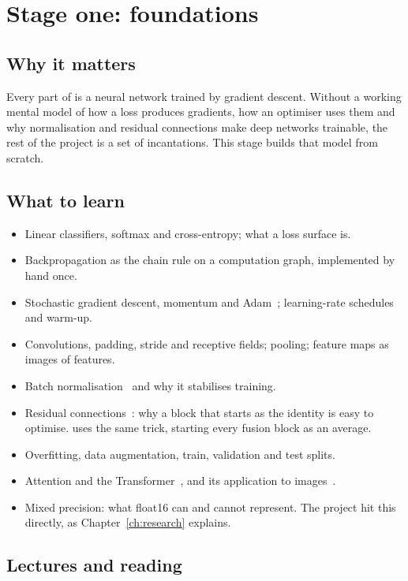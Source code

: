 \chapter{Stage one: foundations}

\section{Why it matters}

Every part of \method{} is a neural network trained by gradient descent. Without a working mental model of
how a loss produces gradients, how an optimiser uses them and why normalisation and residual connections make
deep networks trainable, the rest of the project is a set of incantations. This stage builds that model from
scratch.

\section{What to learn}

\begin{itemize}
  \item Linear classifiers, softmax and cross-entropy; what a loss surface is.
  \item Backpropagation as the chain rule on a computation graph, implemented by hand once.
  \item Stochastic gradient descent, momentum and Adam~\cite{kingma2015adam}; learning-rate schedules and warm-up.
  \item Convolutions, padding, stride and receptive fields; pooling; feature maps as images of features.
  \item Batch normalisation~\cite{ioffe2015batchnorm} and why it stabilises training.
  \item Residual connections~\cite{he2016resnet}: why a block that starts as the identity is easy to optimise.
        \method{} uses the same trick, starting every fusion block as an average.
  \item Overfitting, data augmentation, train, validation and test splits.
  \item Attention and the Transformer~\cite{vaswani2017attention}, and its application to images~\cite{dosovitskiy2021vit}.
  \item Mixed precision: what float16 can and cannot represent. The project hit this directly, as Chapter~\ref{ch:research} explains.
\end{itemize}

\section{Lectures and reading}

